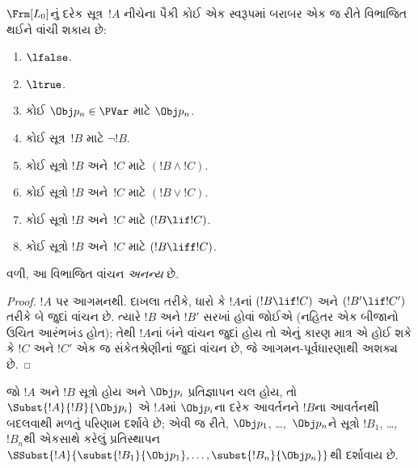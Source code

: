 \begin{prop}[અનન્ય વાચનીયતા]
$\Frm[L_0]$નું દરેક સૂત્ર~$!A$ નીચેના પૈકી કોઈ એક સ્વરૂપમાં
બરાબર એક જ રીતે વિભાજિત થઈને વાંચી શકાય છે:
\begin{enumerate}
\item $\lfalse$.

\item $\ltrue$.

\item કોઈ $\Obj p_n \in \PVar$ માટે $\Obj p_n$.

\item કોઈ સૂત્ર~$!B$ માટે $\lnot !B$.

\item કોઈ સૂત્રો $!B$ અને~$!C$ માટે
$(!B \land !C)$.

\item કોઈ સૂત્રો $!B$ અને~$!C$ માટે
$(!B \lor !C)$.

\item કોઈ સૂત્રો $!B$ અને~$!C$ માટે
$(!B \lif !C)$.

\item કોઈ સૂત્રો $!B$ અને~$!C$ માટે
$(!B \liff !C)$.
\end{enumerate}
વળી, આ વિભાજિત વાંચન \emph{અનન્ય} છે.
\end{prop}

\begin{proof}
$!A$ પર આગમનથી. દાખલા તરીકે, ધારો કે $!A$નાં $(!B \lif !C)$ અને
$(!B' \lif !C')$ તરીકે બે જુદાં વાંચન છે. ત્યારે $!B$ અને $!B'$ સરખાં
હોવાં જોઈએ (નહિતર એક બીજાનો ઉચિત આરંભખંડ હોત); તેથી $!A$નાં બંને
વાંચન જુદાં હોય તો એનું કારણ માત્ર એ હોઈ શકે કે $!C$ અને $!C'$ એક જ
સંકેતશ્રેણીનાં જુદાં વાંચન છે, જે આગમન-પૂર્વધારણાથી અશક્ય છે.
\end{proof}


\begin{defn}[એકરૂપ પ્રતિસ્થાપન]
જો $!A$ અને $!B$ સૂત્રો હોય અને $\Obj p_i$ પ્રતિજ્ઞાપન ચલ હોય, તો $\Subst{!A}{!B}{\Obj p_i}$ એ $!A$માં $\Obj p_i$ના
દરેક આવર્તનને $!B$ના આવર્તનથી બદલવાથી મળતું પરિણામ દર્શાવે છે;
એવી જ રીતે, $\Obj p_1$, \dots,~$\Obj p_n$ને સૂત્રો $!B_1$,
\dots,~$!B_n$થી એકસાથે કરેલું પ્રતિસ્થાપન
$\SSubst{!A}{\subst{!B_1}{\Obj p_1},\dots,\subst{!B_n}{\Obj p_n}}$થી
દર્શાવાય છે.
\end{defn}

